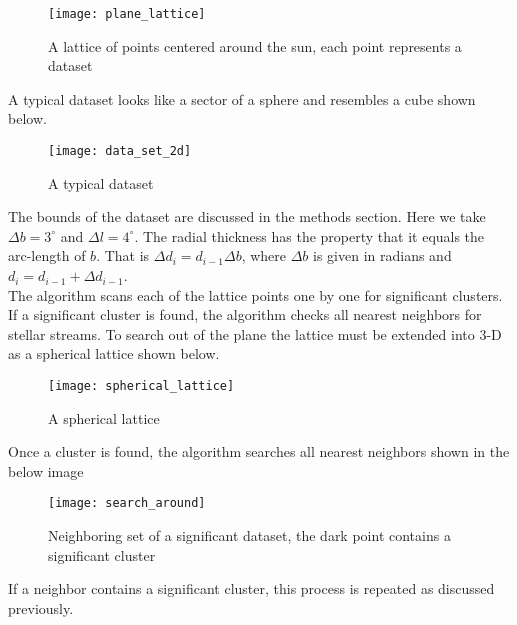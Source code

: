 \documentclass[12pt]{amsart}
\begin{document}
\begin{figure}[h]
\centering
\texttt{[image: plane\_lattice]}
\caption{A lattice of points centered around the sun, each point represents a dataset}
\end{figure}

A typical dataset looks like a sector of a sphere and resembles a cube shown below.

\begin{figure}[h]
\centering
\texttt{[image: data\_set\_2d]}
\caption{A typical dataset}
\end{figure}

The bounds of the dataset are discussed in the methods section. Here we take $\Delta b = 3^{\circ}$ and $\Delta l = 4^{\circ}$. The radial thickness has the property that it equals the arc-length of $b$. That is $\Delta d_i = d_{i-1} \Delta b$, where $\Delta b$ is given in radians and $d_i=d_{i-1} + \Delta d_{i-1}$. \\
The algorithm scans each of the lattice points one by one for significant clusters. If a significant cluster is found, the algorithm checks all nearest neighbors for stellar streams. To search out of the plane the lattice must be extended into 3-D as a spherical lattice shown below.

\begin{figure}[h]
\centering
\texttt{[image: spherical\_lattice]}
\caption{A spherical lattice}
\end{figure}

Once a cluster is found, the algorithm searches all nearest neighbors shown in the below image

\begin{figure}[h]
\centering
\texttt{[image: search\_around]}
\caption{Neighboring set of a significant dataset, the dark point contains a significant cluster}
\end{figure}

If a neighbor contains a significant cluster, this process is repeated as discussed previously.
\end{document}
